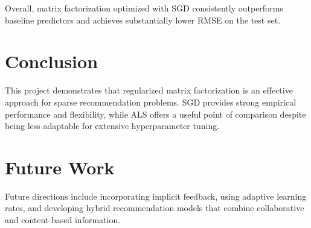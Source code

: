 \documentclass[10pt,twocolumn]{article}
\begin{document}
Overall, matrix factorization optimized with SGD consistently outperforms baseline predictors and achieves substantially lower RMSE on the test set.

\section{Conclusion}
This project demonstrates that regularized matrix factorization is an effective approach for sparse recommendation problems. SGD provides strong empirical performance and flexibility, while ALS offers a useful point of comparison despite being less adaptable for extensive hyperparameter tuning.

\section{Future Work}
Future directions include incorporating implicit feedback, using adaptive learning rates, and developing hybrid recommendation models that combine collaborative and content-based information.
\end{document}
